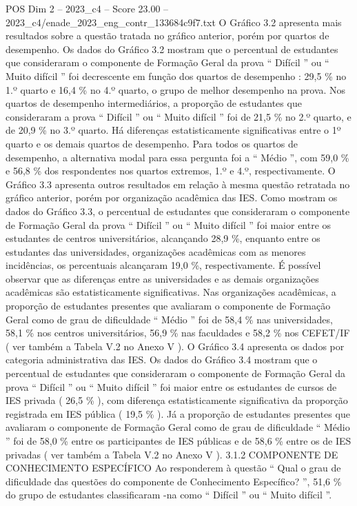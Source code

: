 \begin{textsample}{POS Dim 2 – 2023\_c4 – Score 23.00 – 2023\_c4/enade\_2023\_eng\_contr\_133684c9f7.txt}
O Gráfico 3.2 apresenta mais resultados sobre a questão tratada no gráfico anterior, porém por quartos de desempenho.
Os dados do Gráfico 3.2 mostram que o percentual de estudantes que consideraram o componente de Formação Geral da prova “ Difícil ” ou “ Muito difícil ” foi decrescente em função dos quartos de desempenho : 29,5 \% no 1.º quarto e 16,4 \% no 4.º quarto, o grupo de melhor desempenho na prova.
Nos quartos de desempenho intermediários, a proporção de estudantes que consideraram a prova “ Difícil ” ou “ Muito difícil ” foi de 21,5 \% no 2.º quarto, e de 20,9 \% no 3.º quarto.
Há diferenças estatisticamente significativas entre o 1º quarto e os demais quartos de desempenho.
Para todos os quartos de desempenho, a alternativa modal para essa pergunta foi a “ Médio ”, com 59,0 \% e 56,8 \% dos respondentes nos quartos extremos, 1.º e 4.º, respectivamente.
O Gráfico 3.3 apresenta outros resultados em relação à mesma questão retratada no gráfico anterior, porém por organização acadêmica das IES.
Como mostram os dados do Gráfico 3.3, o percentual de estudantes que consideraram o componente de Formação Geral da prova “ Difícil ” ou “ Muito difícil ” foi maior entre os estudantes de centros universitários, alcançando 28,9 \%, enquanto entre os estudantes das universidades, organizações acadêmicas com as menores incidências, os percentuais alcançaram 19,0 \%, respectivamente.
É possível observar que as diferenças entre as universidades e as demais organizações acadêmicas são estatisticamente significativas.
Nas organizações acadêmicas, a proporção de estudantes presentes que avaliaram o componente de Formação Geral como de grau de dificuldade “ Médio ” foi de 58,4 \% nas universidades, 58,1 \% nos centros universitários, 56,9 \% nas faculdades e 58,2 \% nos CEFET/IF ( ver também a Tabela V.2 no Anexo V ).
O Gráfico 3.4 apresenta os dados por categoria administrativa das IES.
Os dados do Gráfico 3.4 mostram que o percentual de estudantes que consideraram o componente de Formação Geral da prova “ Difícil ” ou “ Muito difícil ” foi maior entre os estudantes de cursos de IES privada ( 26,5 \% ), com diferença estatisticamente significativa da proporção registrada em IES pública ( 19,5 \% ).
Já a proporção de estudantes presentes que avaliaram o componente de Formação Geral como de grau de dificuldade “ Médio ” foi de 58,0 \% entre os participantes de IES públicas e de 58,6 \% entre os de IES privadas ( ver também a Tabela V.2 no Anexo V ). 3.1.2 COMPONENTE DE CONHECIMENTO ESPECÍFICO Ao responderem à questão “ Qual o grau de dificuldade das questões do componente de Conhecimento Específico? ”, 51,6 \% do grupo de estudantes classificaram -na como “ Difícil ” ou “ Muito difícil ”.

\end{textsample}
